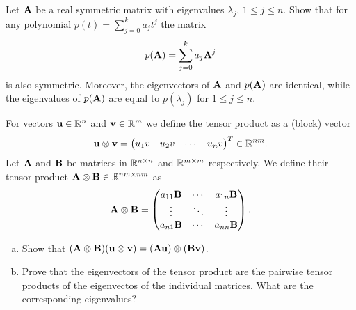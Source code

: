 
\begin{Sheet}
  \label{sheet7}

  \begin{Problem}
    Let $\mathbf A$ be a real symmetric matrix with eigenvalues
    $\lambda_j$, $1\leq j\leq n$. Show that for any polynomial
    $p(t) = \sum_{j=0}^k a_jt^j$
    the matrix
    \begin{gather*}
      p(\mathbf A) = \sum_{j=0}^k a_j\mathbf A^j
    \end{gather*}
    is also symmetric. Moreover, the eigenvectors of $\mathbf A$ and
    $p(\mathbf A)$ are identical, while the eigenvalues of $p(\mathbf A)$ are
    equal to $p(\lambda_j)$ for $1\leq j\leq n$.
  \end{Problem}

  \begin{Problem}
     \label{sheet7:problem2}

    For vectors $\mathbf u\in\mathbb R^n$ and $\mathbf v\in\mathbb R^m$ we define the tensor
    product as a (block) vector
    \begin{gather*}
      \mathbf u\otimes\mathbf v =
      \begin{pmatrix}
        u_1v& u_2v& \cdots & u_nv
      \end{pmatrix}^T \in\mathbb R^{nm}.
    \end{gather*}
    Let $\mathbf A$ and $\mathbf B$ be matrices in $\mathbb R^{n\times n}$ and
    $\mathbb R^{m\times m}$ respectively. We define their tensor product
    $\mathbf A\otimes\mathbf B\in\mathbb R^{nm\times nm}$ as
    \begin{gather*}
      \mathbf A\otimes\mathbf B =
      \begin{pmatrix}
        a_{11}\mathbf B & \cdots & a_{1n}\mathbf B \\
        \vdots & \ddots & \vdots \\
        a_{n1}\mathbf B & \cdots & a_{nn}\mathbf B
      \end{pmatrix}.
    \end{gather*}
    \begin{enumerate}[(a)]
    \item Show that
      $(\mathbf A\otimes\mathbf B)(\mathbf u\otimes\mathbf v) =
      (\mathbf A\mathbf u)\otimes(\mathbf B\mathbf v)$.
    \item Prove that the eigenvectors of the tensor product are the
      pairwise tensor products of the eigenvectos of the individual
      matrices. What are the corresponding eigenvalues?
    \end{enumerate}
  \end{Problem}


\end{Sheet}

